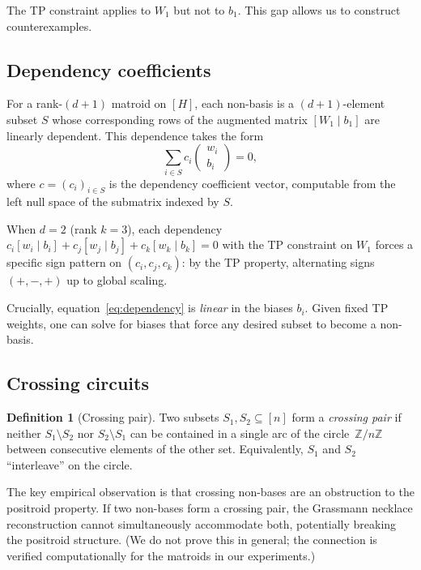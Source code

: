 \documentclass[11pt]{article}
\theoremstyle{definition}
\newtheorem{definition}[theorem]{Definition}
\theoremstyle{remark}
\newcommand{\Z}{\mathbb{Z}}
\begin{document}
The TP constraint applies to $W_1$ but not to $b_1$.  This gap
allows us to construct counterexamples.

\subsection{Dependency coefficients}\label{sec:dependency}

For a rank-$(d{+}1)$ matroid on $[H]$, each non-basis is a
$(d{+}1)$-element subset $S$ whose corresponding rows of the
augmented matrix $[W_1 \mid b_1]$ are linearly dependent.  This
dependence takes the form
\begin{equation}\label{eq:dependency}
  \sum_{i \in S} c_i \begin{pmatrix} w_i \\ b_i \end{pmatrix} = 0,
\end{equation}
where $c = (c_i)_{i \in S}$ is the dependency coefficient vector,
computable from the left null space of the submatrix indexed by $S$.

When $d = 2$ (rank $k = 3$), each dependency
$c_i [w_i \mid b_i] + c_j [w_j \mid b_j] + c_k [w_k \mid b_k] = 0$
with the TP constraint on $W_1$ forces a specific sign pattern on
$(c_i, c_j, c_k)$: by the TP property, alternating signs $(+, -, +)$
up to global scaling.

Crucially, equation~\eqref{eq:dependency} is \emph{linear} in the
biases $b_i$.  Given fixed TP weights, one can solve for biases that
force any desired subset to become a non-basis.

\subsection{Crossing circuits}\label{sec:crossing}

\begin{definition}[Crossing pair]\label{def:crossing}
  Two subsets $S_1, S_2 \subseteq [n]$ form a \emph{crossing pair}
  if neither $S_1 \setminus S_2$ nor $S_2 \setminus S_1$ can be
  contained in a single arc of the circle~$\Z/n\Z$ between
  consecutive elements of the other set.  Equivalently, $S_1$ and
  $S_2$ ``interleave'' on the circle.
\end{definition}

The key empirical observation is that crossing non-bases are an
obstruction to the positroid property.  If two non-bases form a
crossing pair, the Grassmann necklace reconstruction cannot
simultaneously accommodate both, potentially breaking the positroid
structure.  (We do not prove this in general; the connection is
verified computationally for the matroids in our experiments.)
\end{document}
